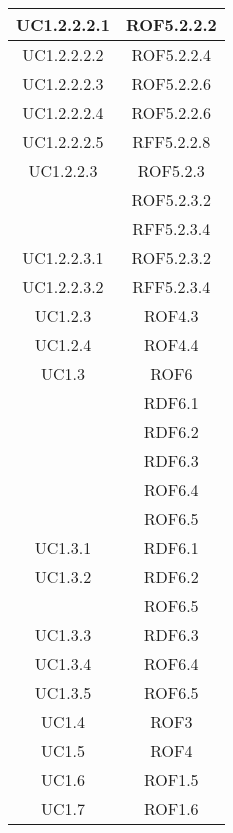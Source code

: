 \begin{longtable}{|c|c|}
\midrule
UC1.2.2.2.1
& ROF5.2.2.2\\

\midrule
UC1.2.2.2.2
& ROF5.2.2.4\\

\midrule
UC1.2.2.2.3
& ROF5.2.2.6\\

\midrule
UC1.2.2.2.4
& ROF5.2.2.6\\

\midrule
UC1.2.2.2.5
& RFF5.2.2.8\\

\midrule
UC1.2.2.3
& ROF5.2.3\\
& ROF5.2.3.2\\
& RFF5.2.3.4\\

\midrule
UC1.2.2.3.1
& ROF5.2.3.2\\

\midrule
UC1.2.2.3.2
& RFF5.2.3.4\\

\midrule
UC1.2.3
& ROF4.3\\

\midrule
UC1.2.4
& ROF4.4\\

\midrule
UC1.3
& ROF6\\
& RDF6.1\\
& RDF6.2\\
& RDF6.3\\
& ROF6.4\\
& ROF6.5\\

\midrule
UC1.3.1
& RDF6.1\\

\midrule
UC1.3.2
& RDF6.2\\
& ROF6.5\\

\midrule
UC1.3.3
& RDF6.3\\

\midrule
UC1.3.4
& ROF6.4\\

\midrule
UC1.3.5
& ROF6.5\\

\midrule
UC1.4
& ROF3\\

\midrule
UC1.5
& ROF4\\

\midrule
UC1.6
& ROF1.5\\

\midrule
UC1.7
& ROF1.6\\


\end{longtable}
